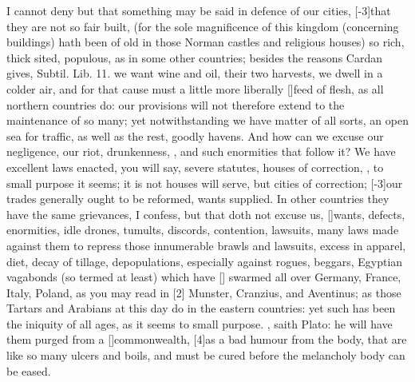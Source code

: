 I cannot deny but that something may be said in defence of our cities,
[-3\baselineskip]that they are not so fair built, (for the sole magnificence of
this kingdom (concerning buildings) hath been of old in those Norman
castles and religious houses) so rich, thick sited, populous, as in
some other countries; besides the reasons Cardan gives, Subtil. Lib.
11. we want wine and oil, their two harvests, we dwell in a colder air,
and for that cause must a little more liberally [\baselineskip]feed of flesh, as
all northern countries do: our provisions will not therefore extend to
the maintenance of so many; yet notwithstanding we have matter of all
sorts, an open sea for traffic, as well as the rest, goodly havens. And
how can we excuse our negligence, our riot, drunkenness, \etc{}, and such
enormities that follow it? We have excellent laws enacted, you will
say, severe statutes, houses of correction, \etc{}, to small purpose it
seems; it is not houses will serve, but cities of correction; [-3\baselineskip]our
trades generally ought to be reformed, wants supplied. In other
countries they have the same grievances, I confess, but that doth not
excuse us, [\baselineskip]wants, defects, enormities, idle drones, tumults,
discords, contention, lawsuits, many laws made against them to repress
those innumerable brawls and lawsuits, excess in apparel, diet, decay
of tillage, depopulations, especially against rogues, beggars,
Egyptian vagabonds (so termed at least) which have [\baselineskip] swarmed all
over Germany, France, Italy, Poland, as you may read in [2\baselineskip] Munster,
Cranzius, and Aventinus; as those Tartars and Arabians at this day do
in the eastern countries: yet such has been the iniquity of all ages,
as it seems to small purpose. ,
 saith Plato: he will have them purged from a [\baselineskip]commonwealth,
[4\baselineskip]as a bad humour from the body, that are like so many ulcers and
boils, and must be cured before the melancholy body can be eased.


